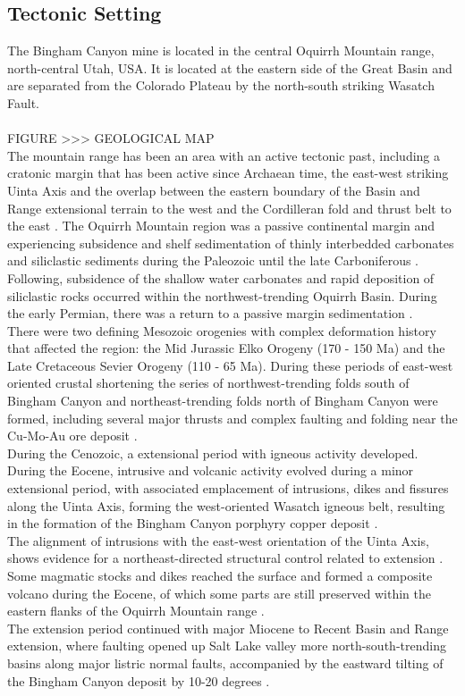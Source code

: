 \documentclass[a4paper,11pt,titlepage]{article}
\begin{document}
\subsection{Tectonic Setting}
The Bingham Canyon mine is located in the central Oquirrh Mountain range, north-central Utah, USA. It is located at the eastern side of the Great Basin and are separated from the Colorado Plateau by the north-south striking Wasatch Fault.
\\
\\ FIGURE >>> GEOLOGICAL MAP
\\\noindent The mountain range has been an area with an active tectonic past, including a cratonic margin that has been active since Archaean time, the east-west striking Uinta Axis and the overlap between the eastern boundary of the Basin and Range extensional terrain to the west and the Cordilleran fold and thrust belt to the east \citep{Babcock1995}. 
The Oquirrh Mountain region was a passive continental margin and experiencing subsidence and shelf sedimentation of thinly interbedded carbonates and siliclastic sediments during the Paleozoic until the late Carboniferous . Following, subsidence of the shallow water carbonates and rapid deposition of siliclastic rocks occurred within the northwest-trending Oquirrh Basin. During the early Permian, there was a return to a passive margin sedimentation \citep{Babcock1995,Presnell1991}.
\\There were two defining Mesozoic orogenies with complex deformation history that affected the region: the Mid Jurassic Elko Orogeny (170 - 150 Ma) and the Late Cretaceous Sevier Orogeny (110 - 65 Ma). During these periods of east-west oriented crustal shortening the series of northwest-trending folds south of Bingham Canyon and northeast-trending folds north of Bingham Canyon were formed, including several major thrusts and complex faulting and folding near the Cu-Mo-Au ore deposit \citep{Babcock1995,Presnell1997,Gunter1997}.
\\During the Cenozoic, a  extensional period with igneous activity developed. During the Eocene, intrusive and volcanic activity evolved during a minor extensional period, with associated emplacement of intrusions, dikes and fissures along the Uinta Axis, forming the west-oriented Wasatch igneous belt, resulting in the formation of the Bingham Canyon porphyry copper deposit \citep{Waite1997}.
\\The alignment of intrusions with the east-west orientation of the Uinta Axis, shows evidence for a northeast-directed structural control related to extension \citep{Presnell1997}. Some magmatic stocks and dikes reached the surface and formed a composite volcano during the Eocene, of which some parts are still preserved within the eastern flanks of the Oquirrh Mountain range \citep{Waite1997}.
\\The extension period continued with major Miocene to Recent Basin and Range extension, where faulting opened up Salt Lake valley more north-south-trending basins along major listric normal faults, accompanied by the eastward tilting of the Bingham Canyon deposit by 10-20 degrees \citep{John1989,Melker1997}.
\end{document}

